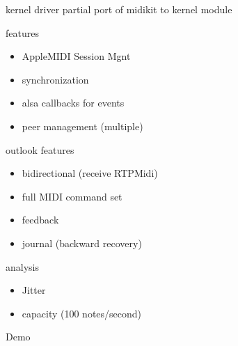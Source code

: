 \begin{frame}{kernel driver}
	partial port of midikit to kernel module
	
	features
	\begin{itemize}
		\item AppleMIDI Session Mgnt
		\item synchronization
		\item alsa callbacks for events
		\item peer management (multiple)
	\end{itemize}
\end{frame}

\begin{frame}{outlook}
	features
	\begin{itemize}
		\item bidirectional (receive RTPMidi)
		\item full MIDI command set
		\item feedback
		\item journal (backward recovery)
	\end{itemize}
	\pause
	analysis
	\begin{itemize}
		\item Jitter
		\item capacity (100 notes/second)
	\end{itemize}
\end{frame}

\begin{frame}
	\centering
	\Huge Demo
\end{frame}
